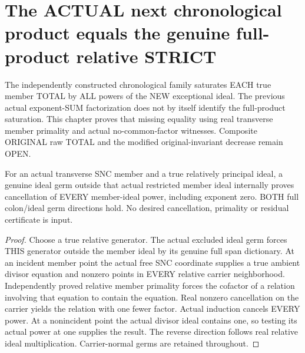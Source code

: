 \section{The ACTUAL next chronological product equals the genuine full-product relative STRICT}

The independently constructed chronological family saturates EACH true member
TOTAL by ALL powers of the NEW exceptional ideal. The previous actual
exponent-SUM factorization does not by itself identify the full-product
saturation. This chapter proves that missing equality using real transverse
member primality and actual no-common-factor witnesses. Composite ORIGINAL
raw TOTAL and the modified original-invariant decrease remain OPEN.

\begin{lemma}
\label{hir:sharp-actual-relative-principal-no-member-factor-all-power-cancellation}
\leanok
For an actual transverse SNC member and a true relatively principal ideal,
a genuine ideal germ outside that actual restricted member ideal internally
proves cancellation of EVERY member-ideal power, including exponent zero.
BOTH full colon/ideal germ directions hold. No desired cancellation,
primality or residual certificate is input.
\end{lemma}
\begin{proof}
Choose a true relative generator. The actual excluded ideal germ forces
THIS generator outside the member ideal by its genuine full span dictionary.
At an incident member point the actual free SNC coordinate supplies a true
ambient divisor equation and nonzero points in EVERY relative carrier
neighborhood. Independently proved relative member primality forces the
cofactor of a relation involving that equation to contain the equation.
Real nonzero cancellation on the carrier yields the relation with one fewer
factor. Actual induction cancels EVERY power. At a nonincident point the
actual divisor ideal contains one, so testing its actual power at one
supplies the result. The reverse direction follows real relative ideal
multiplication. Carrier-normal germs are retained throughout.
\end{proof}

